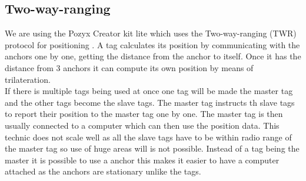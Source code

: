 \subsection{Two-way-ranging}
We are using the Pozyx Creator kit lite which uses the Two-way-ranging (TWR) protocol for positioning \cite{pozyx-Positioning}.
A tag calculates its position by communicating with the anchors one by one, getting the distance from the anchor to itself.
Once it has the distance from 3 anchors it can compute its own position by means of trilateration.
\\
If there is multiple tags being used at once one tag will be made the master tag and the other tags become the slave tags.
The master tag instructs th slave tags to report their position to the master tag one by one.
The master tag is then usually connected to a computer which can then use the position data.
This technic does not scale well as all the slave tags have to be within radio range of the master tag so use of huge areas will is not possible.
Instead of a tag being the master it is possible to use a anchor this makes it easier to have a computer attached as the anchors are stationary unlike the tags.

